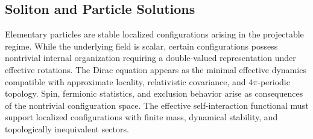 \subsection{Soliton and Particle Solutions}
\label{subsec:soliton-and-particle-solutions}

Elementary particles are stable localized configurations arising in
the projectable regime.
While the underlying field is scalar, certain configurations possess
nontrivial internal organization requiring a double-valued
representation under effective rotations.
The Dirac equation appears as the minimal effective dynamics compatible
with approximate locality, relativistic covariance, and
$4\pi$-periodic topology.
Spin, fermionic statistics, and exclusion behavior arise as
consequences of the nontrivial configuration space.
The effective self-interaction functional must support localized
configurations with finite mass, dynamical stability, and
topologically inequivalent sectors.
